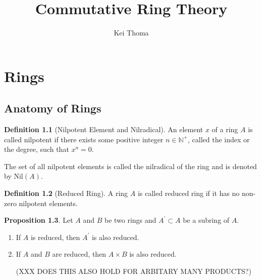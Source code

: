 \documentclass[a4paper]{book}
\title{Commutative Ring Theory}
\author{Kei Thoma}
\theoremstyle{definition}
\newtheorem{definition}{Definition}[]
\newtheorem{proposition}[definition]{Proposition}
\begin{document}
\maketitle
\tableofcontents
\part{Rings}



\chapter{Anatomy of Rings}

\begin{defbox}
    \begin{definition}[Nilpotent Element and Nilradical]
        An element \(x\) of a ring \(A\) is called nilpotent if there exists some positive integer \(n \in \mathbb{N}^+\), called the index or the degree, such that \(x^n = 0\).

        The set of all nilpotent elements is called the nilradical of the ring and is denoted by \(\mathrm{Nil}(A)\).
    \end{definition}
\end{defbox}

\begin{defbox}
    \begin{definition}[Reduced Ring]
        A ring \(A\) is called reduced ring if it has no non-zero nilpotent elements.
    \end{definition}
\end{defbox}

\begin{thmbox}
    \begin{proposition}
        Let \(A\) and \(B\) be two rings and \(A^\prime \subset A\) be a subring of \(A\).
        \begin{enumerate}
            \item If \(A\) is reduced, then \(A^\prime\) is also reduced.
            \item If \(A\) and \(B\) are reduced, then \(A \times B\) is also reduced.
            
            (XXX DOES THIS ALSO HOLD FOR ARBITARY MANY PRODUCTS?)
        \end{enumerate}
    \end{proposition}
\end{thmbox}
\end{document}

